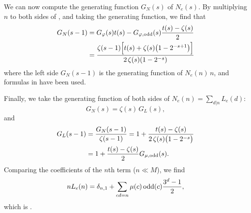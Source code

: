 \documentclass[twocolumn]{revtex4-1}
\begin{document}
We can now compute the generating function $G_N(s)$ of $N_e(s)$.
By multiplying $n$ to both sides of ,
and taking the generating function,
we find that
\begin{align*}
  G_N(s - 1)
    &= G_\varphi(s) t(s)- G_{\varphi, \mathrm{odd}}(s) \frac{t(s)-\zeta(s)}{2} \\
    &=
      \frac{\zeta(s-1) \Big[ t(s) + \zeta(s) \big( 1  - 2^{-s+1} \big) \Big]  }
           {2 \, \zeta(s) (1 - 2^{-s}) }
\end{align*}
where the left side $G_N(s-1)$ is
  the generating function of $N_e(n) \, n$,
and formulas in  have been used.

Finally, we take the generating function of both sides of
 $N_e(n) = \sum_{d|n} L_e(d)$:
\[
  G_N(s) = \zeta(s) \, G_L(s),
\]
and
\begin{align*}
  G_L(s-1)
  & = \frac{G_N(s - 1)}{\zeta(s-1)}
  = 1
        + \frac{ t(s) - \zeta(s) }
          {2 \, \zeta(s) \big(1 - 2^{-s}\big)} \\
  &   = 1 + \frac{t(s) - \zeta(s)}{2} G_{\mu, \mathrm{odd}}(s).
\end{align*}
Comparing the coefficients of the $n$th term ($n \ll M$),
  we find
\[
  n L_e(n) = \delta_{n,1} + \sum_{cd = n} \mu(c) \, \mathrm{odd}(c) \frac{3^d-1}{2},
\]
which is 
\big[also note $\delta_{n,1} = \sum_{c|n}\mu(c)$\big].
\end{document}
